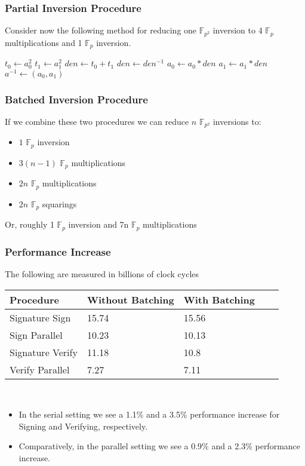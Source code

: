 \documentclass{beamer}
\begin{document}
\begin{frame}[fragile]
\frametitle{Partial Inversion Procedure}
Consider now the following method for reducing one $\mathbb{F}_{p^{2}}$ inversion to 4 $\mathbb{F}_{p}$ multiplications and 1 $\mathbb{F}_{p}$ inversion.
\begin{center}
\begin{algorithm}[H]
\begin{algorithmic}[1]
	\State $t_0 \gets a_{0}^{2}$
	\State $t_1 \gets a_{1}^{2}$
	\State $den \gets t_0 + t_1$
	\State $den \gets den^{-1}$
	\State $a_{0} \gets a_{0} * den$
	\State $a_{1} \gets a_{1} * den$
	\State \Return $a^{-1} \gets (a_{0},a_{1})$
	\EndProcedure
\end{algorithmic}
\end{algorithm}
\end{center}
\end{frame}

\begin{frame}[fragile]
\frametitle{Batched Inversion Procedure}
If we combine these two procedures we can reduce $n$ $\mathbb{F}_{p^{2}}$ inversions to:
\begin{itemize}
\item $1$ $\mathbb{F}_{p}$ inversion
\item $3(n-1)$ $\mathbb{F}_{p}$ multiplications
\item $2n$ $\mathbb{F}_{p}$ multiplications
\item $2n$ $\mathbb{F}_{p}$ squarings
\end{itemize}
Or, roughly 1 $\mathbb{F}_{p}$ inversion and 7n $\mathbb{F}_{p}$ multiplications
\end{frame}

\begin{frame}[fragile]
\frametitle{Performance Increase}
The following are measured in billions of clock cycles
\begin{center}
\begin{tabular}{@{}lllll@{}}
	\toprule
	Procedure & Without Batching & With Batching\\
	\midrule
	Signature Sign & 15.74 & 15.56\\
	Sign Parallel & 10.23 & 10.13\\
	Signature Verify & 11.18 & 10.8\\
	Verify Parallel & 7.27 & 7.11\\
	\bottomrule
\end{tabular}\\
\end{center}
\begin{itemize}
\item In the serial setting we see a 1.1\% and a 3.5\% performance increase for Signing and Verifying, respectively.
\item Comparatively, in the parallel setting we see a 0.9\% and a 2.3\% performance increase.
\end{itemize}
\end{frame}
\end{document}
